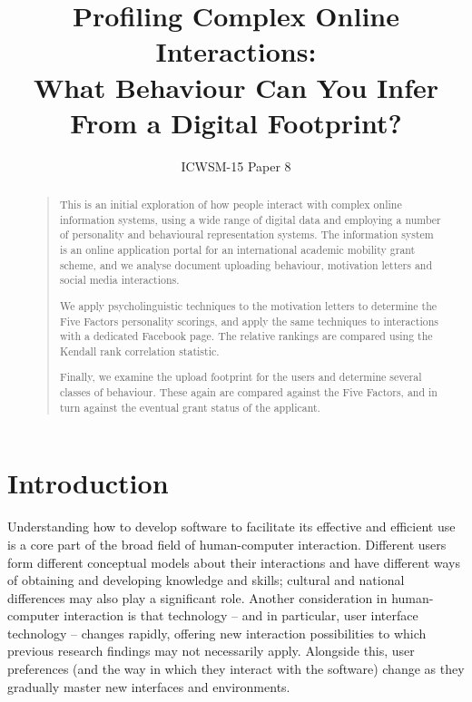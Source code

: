 \documentclass[letterpaper]{article}
\begin{document}
\title{Profiling Complex Online Interactions:\\What Behaviour Can You Infer From a Digital Footprint?}
\author{ICWSM-15 Paper 8}

\maketitle

\begin{abstract}
\begin{quote}
This is an initial exploration of how people interact with complex
online information systems, using a wide range of digital data and
employing a number of personality and behavioural representation
systems. The information system is an online application portal for an
international academic mobility grant scheme, and we analyse document
uploading behaviour, motivation letters and social media
interactions.

We apply psycholinguistic techniques to the motivation letters to
determine the Five Factors personality scorings, and apply the same
techniques to interactions with a dedicated Facebook page. The
relative rankings are compared using the Kendall rank correlation
statistic.

Finally, we examine the upload footprint for the users and determine
several classes of behaviour. These again are compared against the
Five Factors, and in turn against the eventual grant status of the
applicant.
\end{quote}
\end{abstract}


\section{Introduction}

Understanding how to develop software to facilitate its effective and
efficient use is a core part of the broad field of human-computer
interaction. Different users form different conceptual models about
their interactions and have different ways of obtaining and developing
knowledge and skills; cultural and national differences may also play
a significant role. Another consideration in human-computer
interaction is that technology -- and in particular, user interface
technology -- changes rapidly, offering new interaction possibilities
to which previous research findings may not necessarily
apply. Alongside this, user preferences (and the way in which they
interact with the software) change as they gradually master new
interfaces and environments.
\end{document}
